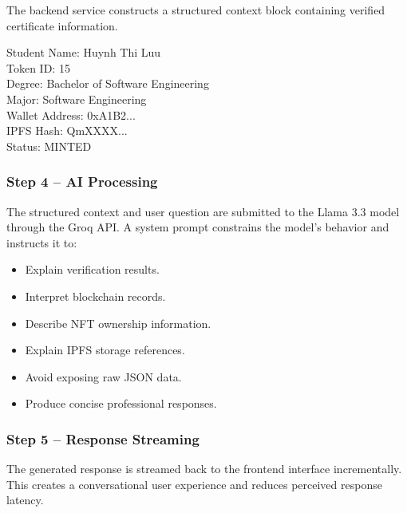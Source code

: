         The backend service constructs a structured context block containing verified certificate information.

        \begin{description}
            \item[Student Name: Huynh Thi Luu] 

            \item[Token ID: 15] 

            \item[Degree: Bachelor of Software Engineering] 

            \item[Major: Software Engineering] 

            \item[Wallet Address: 0xA1B2...] 

            \item[IPFS Hash: QmXXXX...] 

            \item[Status: MINTED]
        \end{description}
        

    \subsubsection{Step 4 – AI Processing}

        The structured context and user question are submitted to the Llama 3.3 model through the Groq API. A system prompt constrains the model's behavior and instructs it to:

        \begin{itemize}
            \item Explain verification results.
            \item Interpret blockchain records.
            \item Describe NFT ownership information.
            \item Explain IPFS storage references.
            \item Avoid exposing raw JSON data.
            \item Produce concise professional responses.
        \end{itemize}

    \subsubsection{Step 5 – Response Streaming}

        The generated response is streamed back to the frontend interface incrementally. This creates a conversational user experience and reduces perceived response latency.
        
        